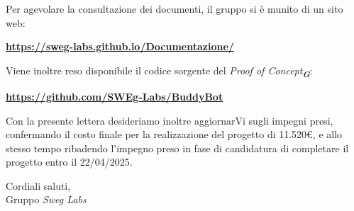 Per agevolare la consultazione dei documenti, il gruppo si è munito di un sito web:
\begin{center}
\textbf{\href{https://sweg-labs.github.io/Documentazione/}{https://sweg-labs.github.io/Documentazione/}}
\end{center}
Viene inoltre reso disponibile il codice sorgente del \emph{Proof of Concept}\textsubscript{\textit{\textbf{G}}}: 
\begin{center}
\textbf{\href{https://github.com/SWEg-Labs/BuddyBot}{https://github.com/SWEg-Labs/BuddyBot}}
\end{center}
Con la presente lettera desideriamo inoltre aggiornarVi sugli impegni presi, confermando il costo finale per la realizzazione del progetto di 11.520\euro, e allo stesso tempo ribadendo l’impegno preso in fase di candidatura di completare il progetto entro il 22/04/2025.\\
\vspace{1.5cm}

Cordiali saluti,\\
Gruppo \emph{Sweg Labs}

